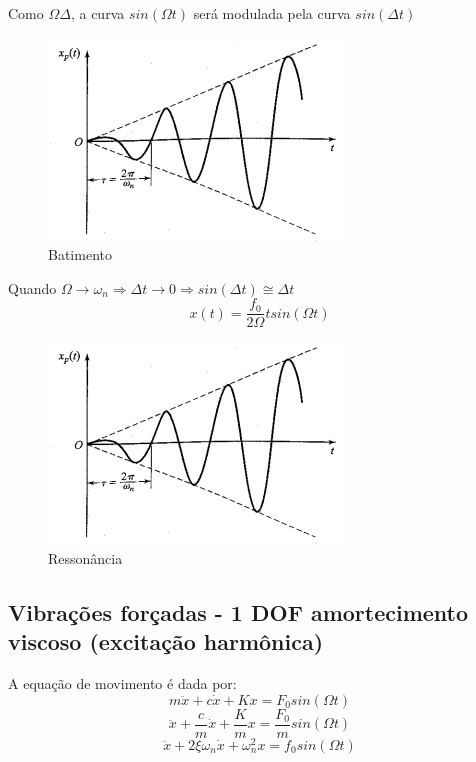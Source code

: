 \documentclass[a4paper, 12pt]{article}
\begin{document}
\newpage
	Como $\Omega \Delta$, a curva $sin(\Omega t)$ será modulada pela curva $sin(\Delta t)$
	\begin{figure}[h]
	\centering
	\includegraphics[scale=0.8]{a7.png}
	\caption{Batimento}
	\end{figure}
	
	Quando $\Omega \rightarrow \omega_n \Rightarrow \Delta t \rightarrow 0 \Rightarrow sin(\Delta t) \cong \Delta t$ 
	\begin{equation}
	x(t) = \frac{f_0}{2\Omega} t sin(\Omega t)
	\end{equation}
	
	\begin{figure}[h]
	\centering
	\includegraphics[scale=0.8]{a7.png}
	\caption{Ressonância}
	\end{figure}
	
\subsection{Vibrações forçadas - 1 DOF amortecimento viscoso (excitação harmônica)}
	A equação de movimento é dada por:
	\begin{equation}
	m\ddot{x} + c \dot{x} + Kx = F_0 sin(\Omega t)
	\end{equation}
	\begin{equation}
	\ddot{x} + \frac{c}{m}\dot{x} + \frac{K}{m}x = \frac{F_0}{m} sin(\Omega t)
	\end{equation}
	\begin{equation}
	\ddot{x} + 2 \xi \omega_n \dot{x} + \omega_n^2 x = f_0 sin(\Omega t)
	\end{equation}
	
\end{document}
